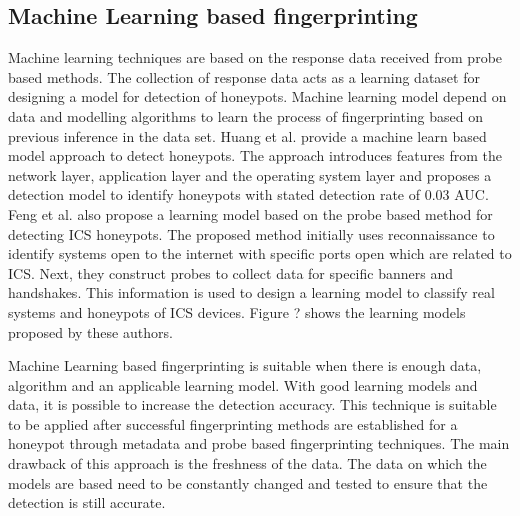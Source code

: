 \documentclass[../main.tex]{subfiles}
\begin{document}
\subsection{Machine Learning based fingerprinting}
Machine learning techniques are based on the response data received from probe based methods. The collection of response data acts as a learning dataset for designing a model for detection of honeypots. Machine learning model depend on data and modelling algorithms to learn the process of fingerprinting based on previous inference in the data set. Huang et al. \cite{huang} provide a machine learn based model approach to detect honeypots. The approach introduces features from the network layer, application layer and the operating system layer and proposes a detection model to identify honeypots with stated detection rate of 0.03 AUC. Feng et al. \cite{Feng2016} also propose a learning model based on the probe based method for detecting ICS honeypots. The proposed method initially uses reconnaissance to identify systems open to the internet with specific ports open which are related to ICS. Next, they construct probes to collect data for specific banners and handshakes. This information is used to design a learning model to classify real systems and honeypots of ICS devices. Figure ? shows the learning models proposed by these authors. 

Machine Learning based fingerprinting is suitable when there is enough data, algorithm and an applicable learning model. With good learning models and data, it is possible to increase the detection accuracy. This technique is suitable to be applied after successful fingerprinting methods are established for a honeypot through metadata and probe based fingerprinting techniques. The main drawback of this approach is the freshness of the data. The data on which the models are based need to be constantly changed and tested to ensure that the detection is still accurate. 
\end{document}
